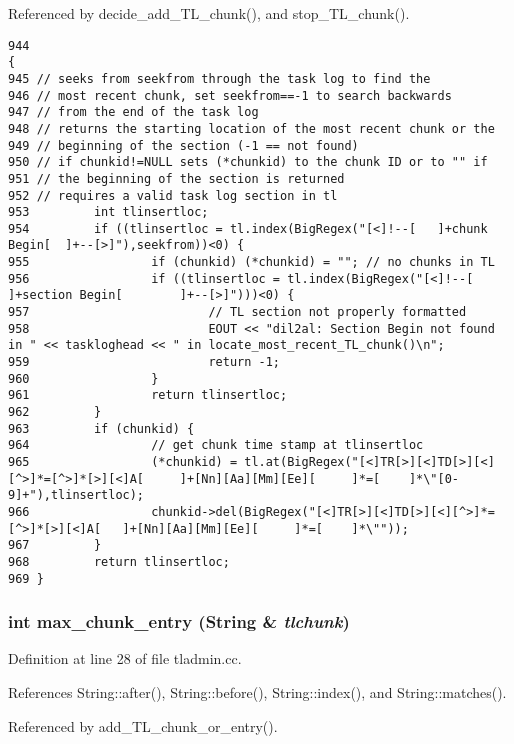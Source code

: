 Referenced by decide\_\-add\_\-TL\_\-chunk(), and stop\_\-TL\_\-chunk().



\footnotesize\begin{verbatim}944                                                                              {
945 // seeks from seekfrom through the task log to find the
946 // most recent chunk, set seekfrom==-1 to search backwards
947 // from the end of the task log
948 // returns the starting location of the most recent chunk or the
949 // beginning of the section (-1 == not found)
950 // if chunkid!=NULL sets (*chunkid) to the chunk ID or to "" if
951 // the beginning of the section is returned
952 // requires a valid task log section in tl
953         int tlinsertloc;
954         if ((tlinsertloc = tl.index(BigRegex("[<]!--[   ]+chunk Begin[  ]+--[>]"),seekfrom))<0) {
955                 if (chunkid) (*chunkid) = ""; // no chunks in TL
956                 if ((tlinsertloc = tl.index(BigRegex("[<]!--[   ]+section Begin[        ]+--[>]")))<0) {
957                         // TL section not properly formatted
958                         EOUT << "dil2al: Section Begin not found in " << taskloghead << " in locate_most_recent_TL_chunk()\n";
959                         return -1;
960                 } 
961                 return tlinsertloc;
962         }
963         if (chunkid) {
964                 // get chunk time stamp at tlinsertloc
965                 (*chunkid) = tl.at(BigRegex("[<]TR[>][<]TD[>][<][^>]*=[^>]*[>][<]A[     ]+[Nn][Aa][Mm][Ee][     ]*=[    ]*\"[0-9]+"),tlinsertloc);
966                 chunkid->del(BigRegex("[<]TR[>][<]TD[>][<][^>]*=[^>]*[>][<]A[   ]+[Nn][Aa][Mm][Ee][     ]*=[    ]*\""));
967         }
968         return tlinsertloc;
969 }
\end{verbatim}\normalsize 
{}
\subsubsection{\setlength{\rightskip}{0pt plus 5cm}int max\_\-chunk\_\-entry ({\bf String} \& {\em tlchunk})}\label{tladmin_8cc_a1}




Definition at line 28 of file tladmin.cc.

References String::after(), String::before(), String::index(), and String::matches().

Referenced by add\_\-TL\_\-chunk\_\-or\_\-entry().



